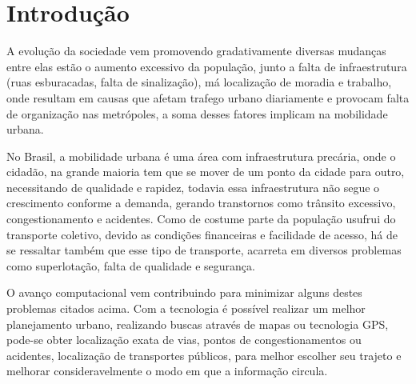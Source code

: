 \chapter{Introdução} %
\label{cha:introducao}

A evolução da sociedade vem promovendo gradativamente diversas mudanças entre elas estão o aumento excessivo da população, junto a falta de infraestrutura (ruas esburacadas, falta de sinalização), má localização de moradia e trabalho, onde resultam em causas que afetam trafego urbano diariamente e provocam falta de organização nas metrópoles, a soma desses fatores implicam na mobilidade urbana.

No Brasil, a mobilidade urbana é uma área com infraestrutura precária, onde o cidadão, na grande maioria tem que se mover de um ponto da cidade para outro, necessitando de qualidade e rapidez, todavia essa  infraestrutura não segue o crescimento conforme a demanda, gerando transtornos como trânsito excessivo, congestionamento e acidentes. Como de costume parte da população usufrui do transporte coletivo, devido as condições financeiras e facilidade de acesso, há de se ressaltar também que esse tipo de transporte, acarreta em diversos problemas como superlotação, falta de qualidade e segurança.

O avanço computacional vem contribuindo para minimizar alguns destes problemas citados acima. Com a tecnologia é possível realizar um melhor planejamento urbano, realizando buscas através de mapas ou tecnologia GPS, pode-se obter localização exata de vias, pontos de congestionamentos ou acidentes, localização de transportes públicos, para melhor escolher seu trajeto e melhorar consideravelmente o modo em que a informação circula.


